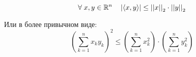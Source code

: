 \documentclass[../main.tex]{subfiles}
\begin{document}
\begin{crl}
    
    ~

    \[ \forall \; x, y \in \mathbb{R} ^n\quad \left| \langle x, y \rangle \right| \leq \left| \left| x\right|\right|_2 \cdot \left| \left| y\right|\right|_2\]

    Или в более привычном виде:
    \[ \left( \sum\limits_{ k=1}^{ n} x_ky_k\right)^2 \leq \left( \sum\limits_{ k=1}^{ n} x_k^2\right) \cdot \left( \sum\limits_{ k=1}^{ n} y_k^2\right)\]
\end{crl}
\end{document}
